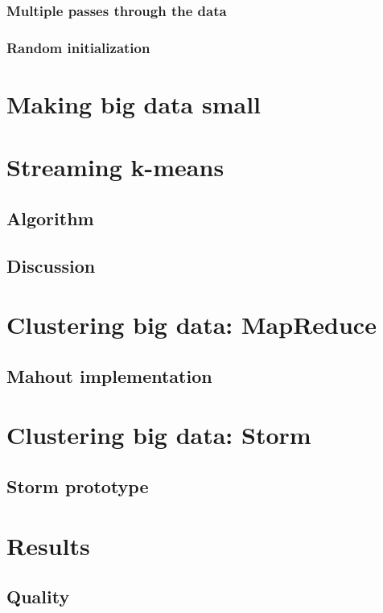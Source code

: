 \documentclass{article}
\begin{document}
\subsubsection{Multiple passes through the data}

\subsubsection{Random initialization}

\section{Making big data small}

\section{Streaming k-means}

\subsection{Algorithm}

\subsection{Discussion}

\section{Clustering big data: MapReduce}

\subsection{Mahout implementation}

\section{Clustering big data: Storm}

\subsection{Storm prototype}

\section{Results}

\subsection{Quality}
\end{document}
